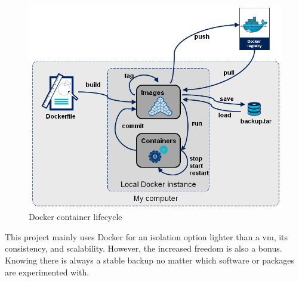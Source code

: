 \begin{figure}[!h]
  \centering
  \includegraphics[width=0.7\linewidth]{images/docker_container_lifecycle.png}
  \caption{Docker container lifecycle \cite{octo_talks}}
\end{figure}

This project mainly uses Docker for an isolation option lighter than a \acs{vm}, its consistency, and scalability. However, the increased freedom is also a bonus. Knowing there is always a stable backup no matter which software or packages are experimented with.